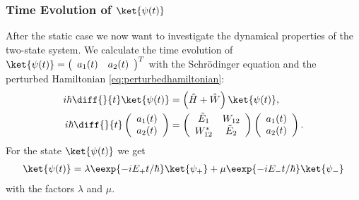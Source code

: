 			\subsubsection{Time Evolution of $\ket{\psi(t)}$}
				After the static case we now want to investigate the dynamical properties of the two-state system. We calculate the time evolution of $\ket{\psi(t)} = \left(\begin{array}{cc} a_1(t) & a_2(t)\end{array}\right)^T$ with the Schrödinger equation and the perturbed Hamiltonian \eqref{eq:perturbedhamiltonian}:
				\begin{align}
					i\hbar \diff{}{t}\ket{\psi(t)}&=\left(\hat{H}+\hat{W}\right)\ket{\psi(t)},\\
					i\hbar \diff{}{t}\left(\begin{array}{c} a_1(t) \\ a_2(t) \end{array}\right) &= \left( \begin{array}{cc} \tilde{E}_1 & W_{12} \\ W_{12}^* & \tilde{E}_2 \end{array} \right) \left(\begin{array}{c} a_1(t) \\ a_2(t) \end{array} \right).
				\end{align}
				For the state $\ket{\psi(t)}$ we get
				\begin{align}
					\ket{\psi(t)}=\lambda \eexp{-i{E_+}t/{\hbar}} \ket{\psi_+} + \mu \eexp{-i{E_-}t/{\hbar}} \ket{\psi_-} \label{eq:psitimeevolution}
				\end{align}
				with the factors $\lambda$ and $\mu$.

